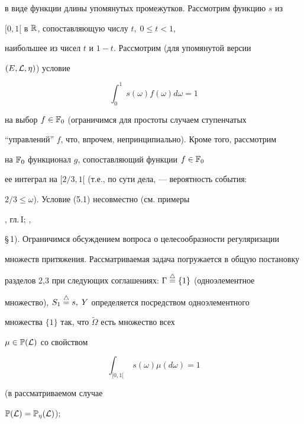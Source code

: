 в виде функции длины упомянутых промежутков. Рассмотрим функцию $s$ из


$[0,1[$ в ${\Bbb R}$, сопоставляющую числу $t,\;0 \le t < 1$,


наибольшее из чисел $t$ и $1 - t$. Рассмотрим (для упомянутой версии


$(E,{\cal L},\eta)$) условие


%


\begin{equation}


{{\int}^1_0}\;{s(\omega)}{f(\omega)}{d\omega} = 1


\end{equation}


%


на выбор $f \in {{\Bbb F}_0}$ (ограничимся для простоты случаем ступенчатых


``управлений'' $f$, что, впрочем, непринципиально). Кроме того, рассмотрим


на ${\Bbb F}_0$ функционал $g$, сопоставляющий функции $f \in {\Bbb F}_0$


ее интеграл на $[2/3,1[$ (т.е., по сути дела, --- вероятность события:


$2/3 \le \omega$). Условие (5.1) несовместно (см. примеры


\cite{Ch1}, гл.\,I; \cite{Ch3},


\S\,1). Ограничимся обсуждением вопроса о целесообразности регуляризации


множеств притяжения. Рассматриваемая задача погружается в общую постановку


разделов 2,3 при следующих соглашениях: $\Gamma\overset{\triangle}{=}\{1\}$ (одноэлементное


множество), ${S_1}\overset{\triangle}{=}{s},\;Y$ определяется посредством одноэлементного


множества $\{1\}$ так, что $\tilde \Omega$ есть множество всех


$\mu \in {\Bbb P}({\cal L})$ со свойством


%


\begin{equation}


{{\int}_{[0,1[}}\;{s(\omega)}{{\mu}(d\omega)} = 1


\end{equation}


%


(в рассматриваемом случае


${\Bbb P}({\cal L}) = {{\Bbb P}_\eta}({\cal L})$);


